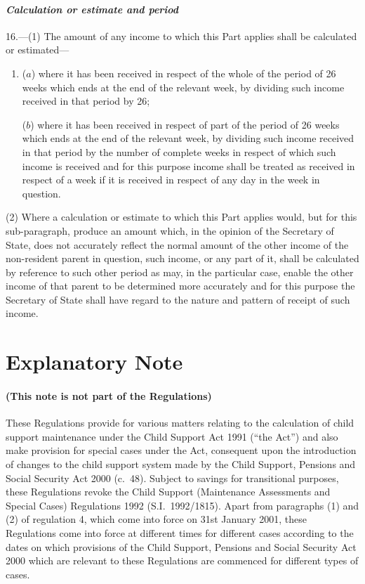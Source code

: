 \documentclass[12pt,a4paper]{article}
\begin{document}
\subsection*{\itshape Calculation or estimate and period}

16.---(1)  The amount of any income to which this Part applies shall be calculated or estimated—
\begin{enumerate}\item[]
($a$) where it has been received in respect of the whole of the period of 26 weeks which ends at the end of the relevant week, by dividing such income received in that period by 26;

($b$) where it has been received in respect of part of the period of 26 weeks which ends at the end of the relevant week, by dividing such income received in that period by the number of complete weeks in respect of which such income is received and for this purpose income shall be treated as received in respect of a week if it is received in respect of any day in the week in question.
\end{enumerate}

(2) Where a calculation or estimate to which this Part applies would, but for this sub-paragraph, produce an amount which, in the opinion of the Secretary of State, does not accurately reflect the normal amount of the other income of the non-resident parent in question, such income, or any part of it, shall be calculated by reference to such other period as may, in the particular case, enable the other income of that parent to be determined more accurately and for this purpose the Secretary of State shall have regard to the nature and pattern of receipt of such income. 

\part{Explanatory Note}

\renewcommand\parthead{--- Explanatory Note}

\subsection*{(This note is not part of the Regulations)}

These Regulations provide for various matters relating to the calculation of child support maintenance under the Child Support Act 1991 (“the Act”) and also make provision for special cases under the Act, consequent upon the introduction of changes to the child support system made by the Child Support, Pensions and Social Security Act 2000 (c.\ 48). Subject to savings for transitional purposes, these Regulations revoke the Child Support (Maintenance Assessments and Special Cases) Regulations 1992 (S.I.\ 1992/1815). Apart from paragraphs (1) and (2) of regulation 4, which come into force on 31st January 2001, these Regulations come into force at different times for different cases according to the dates on which provisions of the Child Support, Pensions and Social Security Act 2000 which are relevant to these Regulations are commenced for different types of cases.
\end{document}
